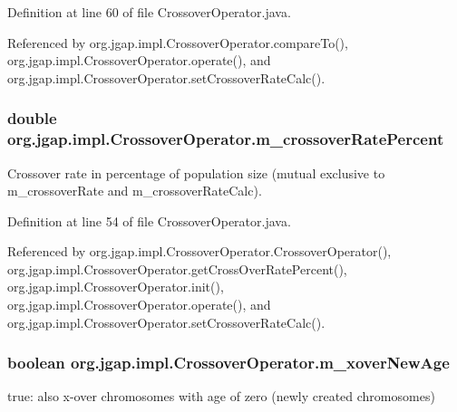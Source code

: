 Definition at line 60 of file Crossover\-Operator.\-java.



Referenced by org.\-jgap.\-impl.\-Crossover\-Operator.\-compare\-To(), org.\-jgap.\-impl.\-Crossover\-Operator.\-operate(), and org.\-jgap.\-impl.\-Crossover\-Operator.\-set\-Crossover\-Rate\-Calc().

\hypertarget{classorg_1_1jgap_1_1impl_1_1_crossover_operator_a90f409ea79fa88fabab8dcbdbbc8a00d}{
\subsubsection[{m\-\_\-crossover\-Rate\-Percent}]{\setlength{\rightskip}{0pt plus 5cm}double org.\-jgap.\-impl.\-Crossover\-Operator.\-m\-\_\-crossover\-Rate\-Percent\hspace{0.3cm}{\ttfamily [private]}}}\label{classorg_1_1jgap_1_1impl_1_1_crossover_operator_a90f409ea79fa88fabab8dcbdbbc8a00d}
Crossover rate in percentage of population size (mutual exclusive to m\-\_\-crossover\-Rate and m\-\_\-crossover\-Rate\-Calc). 

Definition at line 54 of file Crossover\-Operator.\-java.



Referenced by org.\-jgap.\-impl.\-Crossover\-Operator.\-Crossover\-Operator(), org.\-jgap.\-impl.\-Crossover\-Operator.\-get\-Cross\-Over\-Rate\-Percent(), org.\-jgap.\-impl.\-Crossover\-Operator.\-init(), org.\-jgap.\-impl.\-Crossover\-Operator.\-operate(), and org.\-jgap.\-impl.\-Crossover\-Operator.\-set\-Crossover\-Rate\-Calc().

\hypertarget{classorg_1_1jgap_1_1impl_1_1_crossover_operator_a3fd77bb9d65f47999fd875cb58d52099}{
\subsubsection[{m\-\_\-xover\-New\-Age}]{\setlength{\rightskip}{0pt plus 5cm}boolean org.\-jgap.\-impl.\-Crossover\-Operator.\-m\-\_\-xover\-New\-Age\hspace{0.3cm}{\ttfamily [private]}}}\label{classorg_1_1jgap_1_1impl_1_1_crossover_operator_a3fd77bb9d65f47999fd875cb58d52099}
true\-: also x-\/over chromosomes with age of zero (newly created chromosomes) 

